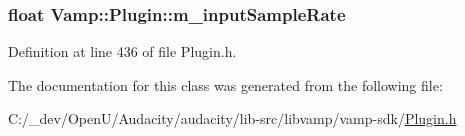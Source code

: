 \subsubsection[{\texorpdfstring{m\+\_\+input\+Sample\+Rate}{m_inputSampleRate}}]{\setlength{\rightskip}{0pt plus 5cm}float Vamp\+::\+Plugin\+::m\+\_\+input\+Sample\+Rate\hspace{0.3cm}{\ttfamily [protected]}}\hypertarget{class_vamp_1_1_plugin_a59b9dd82a4f4eb946cd0474cc81abc23}{}\label{class_vamp_1_1_plugin_a59b9dd82a4f4eb946cd0474cc81abc23}


Definition at line 436 of file Plugin.\+h.



The documentation for this class was generated from the following file\+:\begin{DoxyCompactItemize}
\item 
C\+:/\+\_\+dev/\+Open\+U/\+Audacity/audacity/lib-\/src/libvamp/vamp-\/sdk/\hyperlink{libvamp_2vamp-sdk_2plugin_8h}{Plugin.\+h}\end{DoxyCompactItemize}
